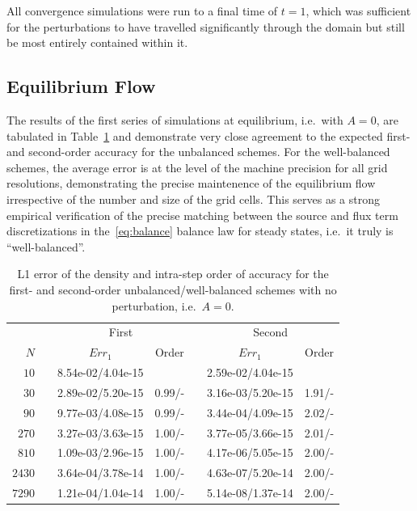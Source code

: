 All convergence simulations were run to a final time of $t=1$, which was sufficient for the perturbations to have travelled significantly through the domain but still be most entirely contained within it.

\subsection{Equilibrium Flow}

The results of the first series of simulations at equilibrium, i.e.\ with $A=0$, are tabulated in Table~\ref{table:OVS_A0} and demonstrate very close agreement to the expected first- and second-order accuracy for the unbalanced schemes. For the well-balanced schemes, the average error is at the level of the machine precision for all grid resolutions, demonstrating the precise maintenence of the equilibrium flow irrespective of the number and size of the grid cells. This serves as a strong empirical verification of the precise matching between the source and flux term discretizations in the~\eqref{eq:balance} balance law for steady states, i.e.\ it truly is ``well-balanced''.

\begin{table}\centering
\caption{L1 error of the density and intra-step order of accuracy for the first- and second-order unbalanced/well-balanced schemes with no perturbation, i.e.\ $A=0$.}
\label{table:OVS_A0}
\begin{tabular}{@{}rcccccc@{}}\toprule
& \phantom{a} & \multicolumn{2}{c}{First} & \phantom{ab} & \multicolumn{2}{c}{Second}\\
\cmidrule{3-4} \cmidrule{6-7}
$N$ && $Err_1$ & Order && $Err_1$ & Order\\ \midrule
$10$ && 8.54e-02/4.04e-15 &&& 2.59e-02/4.04e-15 &\\
$30$ && 2.89e-02/5.20e-15 & 0.99/- && 3.16e-03/5.20e-15 & 1.91/-\\
$90$ && 9.77e-03/4.08e-15 & 0.99/- && 3.44e-04/4.09e-15 & 2.02/-\\
$270$ && 3.27e-03/3.63e-15 & 1.00/- && 3.77e-05/3.66e-15 & 2.01/-\\
$810$ && 1.09e-03/2.96e-15 & 1.00/- && 4.17e-06/5.05e-15 & 2.00/-\\
$2430$ && 3.64e-04/3.78e-14 & 1.00/- && 4.63e-07/5.20e-14 & 2.00/-\\
$7290$ && 1.21e-04/1.04e-14 & 1.00/- && 5.14e-08/1.37e-14 & 2.00/-\\
\bottomrule
\end{tabular}
\end{table}

